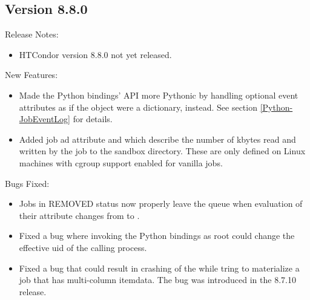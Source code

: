 \subsection*{\label{sec:New-8-8-0}Version 8.8.0}

\noindent Release Notes:

\begin{itemize}

\item HTCondor version 8.8.0 not yet released.

\end{itemize}


\noindent New Features:

\begin{itemize}

\item Made the Python bindings'  API more Pythonic by
handling optional event attributes as if the  object
were a dictionary, instead.  See section \ref{Python-JobEventLog} for details.

\item Added job ad attribute  and 
which describe the number of kbytes read and written by the job to the sandbox
directory.  These are only defined on Linux machines with cgroup support enabled
for vanilla jobs.

\end{itemize}

\noindent Bugs Fixed:

\begin{itemize}

\item Jobs in REMOVED status now properly leave the queue when
evaluation of their  attribute changes from
 to .

\item Fixed a bug where invoking the Python bindings as root could change
the effective uid of the calling process.

\item Fixed a bug that could result in crashing of the  while
tring to materialize a job that has multi-column itemdata. The bug was introduced in
the 8.7.10 release.

\end{itemize}

